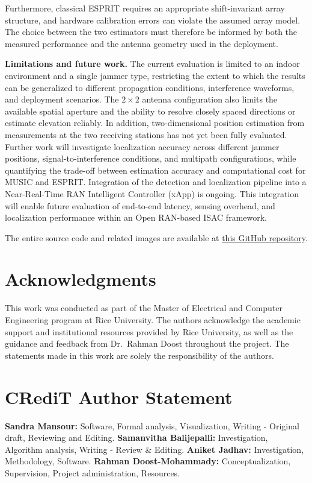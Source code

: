 \documentclass[conference]{IEEEtran}
\begin{document}
 Furthermore, classical ESPRIT
requires an appropriate shift-invariant array structure, and
hardware calibration errors can violate the assumed array model.
The choice between the two estimators must therefore be informed
by both the measured performance and the antenna geometry used
in the deployment.

\textbf{Limitations and future work.}
The current evaluation is limited to an indoor environment and
a single jammer type, restricting the extent to which the results
can be generalized to different propagation conditions,
interference waveforms, and deployment scenarios. The
$2\times2$ antenna configuration also limits the available
spatial aperture and the ability to resolve closely spaced
directions or estimate elevation reliably. In addition,
two-dimensional position estimation from measurements at the
two receiving stations has not yet been fully evaluated.
Further work will investigate localization accuracy across
different jammer positions, signal-to-interference conditions,
and multipath configurations, while quantifying the trade-off
between estimation accuracy and computational cost for MUSIC
and ESPRIT. Integration of the detection and localization
pipeline into a Near-Real-Time RAN Intelligent Controller
(xApp) is ongoing. This integration will enable future
evaluation of end-to-end latency, sensing overhead, and
localization performance within an Open RAN-based ISAC
framework.

The entire source code and related images are available at \href{https://github.com/AniketttJadhav/srsRAN-Open5GS}{this GitHub repository}.

\section*{Acknowledgments}

This work was conducted as part of the Master of Electrical and Computer
Engineering program at Rice University. The authors acknowledge the
academic support and institutional resources provided by Rice University,
as well as the guidance and feedback from Dr.\ Rahman Doost throughout
the project. The statements made in this work are solely the
responsibility of the authors.



\section*{CRediT Author Statement}

\textbf{Sandra Mansour:} Software, Formal analysis, Visualization,
Writing - Original draft, Reviewing and Editing. \textbf{Samanvitha Balijepalli:}
Investigation, Algorithm analysis, Writing - Review \& Editing.
\textbf{Aniket Jadhav:} Investigation, Methodology, Software.
\textbf{Rahman Doost-Mohammady:} Conceptualization, Supervision, Project
administration, Resources.



\end{document}
